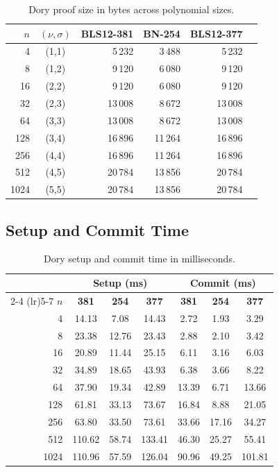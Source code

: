 \begin{table}[H]
\centering
\caption{Dory proof size in bytes across polynomial sizes.}
\label{tab:dory-proof-size}
\begin{tabular}{rcrrrr}
\toprule
$n$ & $(\nu,\sigma)$ & \textbf{BLS12-381} & \textbf{BN-254} & \textbf{BLS12-377} \\
\midrule
4    & (1,1) & 5\,232  & 3\,488  & 5\,232  \\
8    & (1,2) & 9\,120  & 6\,080  & 9\,120  \\
16   & (2,2) & 9\,120  & 6\,080  & 9\,120  \\
32   & (2,3) & 13\,008 & 8\,672  & 13\,008 \\
64   & (3,3) & 13\,008 & 8\,672  & 13\,008 \\
128  & (3,4) & 16\,896 & 11\,264 & 16\,896 \\
256  & (4,4) & 16\,896 & 11\,264 & 16\,896 \\
512  & (4,5) & 20\,784 & 13\,856 & 20\,784 \\
1024 & (5,5) & 20\,784 & 13\,856 & 20\,784 \\
\bottomrule
\end{tabular}
\end{table}

\subsection{Setup and Commit Time}

\begin{table}[H]
\centering
\caption{Dory setup and commit time in milliseconds.}
\label{tab:dory-setup-commit}
\begin{tabular}{rcccccc}
\toprule
& \multicolumn{3}{c}{\textbf{Setup (ms)}} & \multicolumn{3}{c}{\textbf{Commit (ms)}} \\
\cmidrule(lr){2-4} \cmidrule(lr){5-7}
$n$ & \textbf{381} & \textbf{254} & \textbf{377}
    & \textbf{381} & \textbf{254} & \textbf{377} \\
\midrule
4    & 14.13  & 7.08  & 14.43  & 2.72  & 1.93  & 3.29  \\
8    & 23.38  & 12.76 & 23.43  & 2.88  & 2.10  & 3.42  \\
16   & 20.89  & 11.44 & 25.15  & 6.11  & 3.16  & 6.03  \\
32   & 34.89  & 18.65 & 43.93  & 6.38  & 3.66  & 8.22  \\
64   & 37.90  & 19.34 & 42.89  & 13.39 & 6.71  & 13.66 \\
128  & 61.81  & 33.13 & 73.67  & 16.84 & 8.88  & 21.05 \\
256  & 63.80  & 33.50 & 73.61  & 33.66 & 17.16 & 34.27 \\
512  & 110.62 & 58.74 & 133.41 & 46.30 & 25.27 & 55.41 \\
1024 & 110.96 & 57.59 & 126.04 & 90.96 & 49.25 & 101.81 \\
\bottomrule
\end{tabular}
\end{table}

